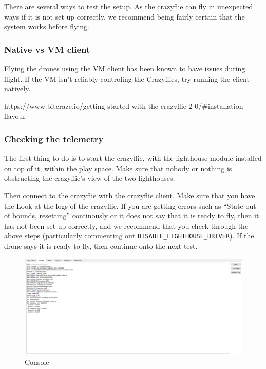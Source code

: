 There are several ways to test the setup. As the crazyflie can fly in
unexpected ways if it is not set up correctly, we recommend being fairly
certain that the system works before flying.

\hypertarget{native-vs-vm-client}{%
\subsubsection{Native vs VM client}\label{native-vs-vm-client}}

Flying the drones using the VM client has been known to have issues
during flight. If the VM isn't reliably controling the Crazyflies, try
running the client natively.

https://www.bitcraze.io/getting-started-with-the-crazyflie-2-0/\#installation-flavour

\hypertarget{checking-the-telemetry}{%
\subsubsection{Checking the telemetry}\label{checking-the-telemetry}}

The first thing to do is to start the crazyflie, with the lighthouse
module installed on top of it, within the play space. Make sure that
nobody or nothing is obstructing the crazyflie's view of the two
lighthouses.

Then connect to the crazyflie with the crazyflie client. Make sure that
you have the Look at the logs of the crazyflie. If you are getting
errors such as ``State out of bounds, resetting'' continously or it does
not say that it is ready to fly, then it has not been set up correctly,
and we recommend that you check through the above steps (particularly
commenting out \texttt{DISABLE\_LIGHTHOUSE\_DRIVER}). If the drone says
it is ready to fly, then continue onto the next test.

\begin{figure}
\centering
\includegraphics{images/console.png}
\caption{Console}
\end{figure}

